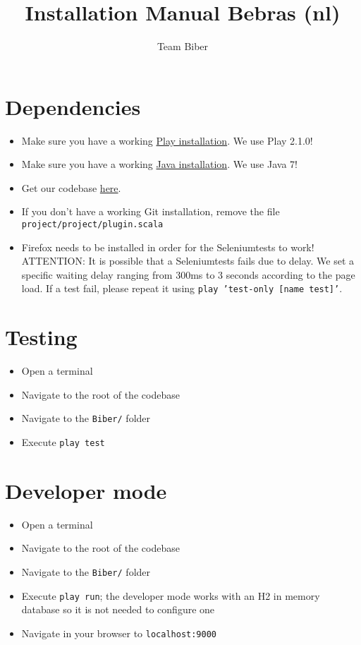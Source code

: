 \documentclass[11pt,a4paper]{article}
\title{Installation Manual Bebras (nl)}
\author{Team Biber}
\begin{document}
\maketitle
\parindent 0pt

\section{Dependencies}
\begin{itemize}
\item Make sure you have a working \href{http://www.playframework.com/documentation/2.1.0/Home}{Play installation}. We use Play 2.1.0!
\item Make sure you have a working \href{http://www.oracle.com/technetwork/java/javase/downloads/index.html}{Java installation}. We use Java 7!
\item Get our codebase \href{https://github.ugent.be/tnnaesse/Biber}{here}.
\item If you don't have a working Git installation, remove the file \texttt{project/project/plugin.scala}
\item Firefox needs to be installed in order for the Seleniumtests to work! ATTENTION: It is possible that a Seleniumtests fails due to delay. We set a specific waiting delay ranging from 300ms to 3 seconds according to the page load. If a test fail, please repeat it using \texttt{play 'test-only [name test]'}.
\end{itemize}

\section{Testing}
\begin{itemize}
\item Open a terminal
\item Navigate to the root of the codebase
\item Navigate to the \texttt{Biber/} folder
\item Execute \texttt{play test}
\end{itemize}

\section{Developer mode}
\begin{itemize}
\item Open a terminal
\item Navigate to the root of the codebase
\item Navigate to the \texttt{Biber/} folder
\item Execute \texttt{play run}; the developer mode works with an H2 in memory database so it is not needed to configure one
\item Navigate in your browser to \texttt{localhost:9000}
\end{itemize}
\end{document}
